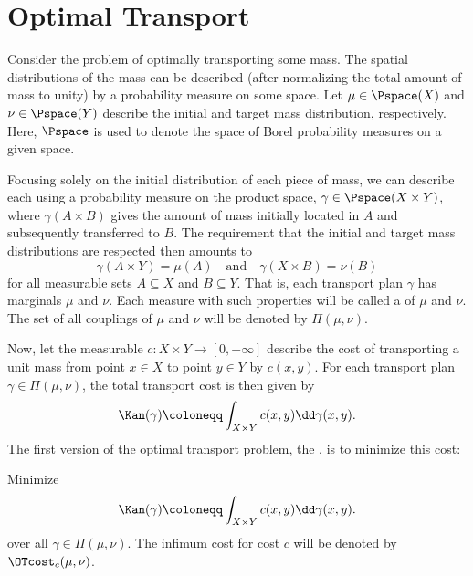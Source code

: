 \documentclass[oneside,reqno,letterpaper]{amsart}
\title[]{}
\author{Aden Chen}
\begin{document}
\maketitle

\tableofcontents

\section{Optimal Transport}

Consider the problem of optimally transporting some mass.
The spatial distributions of the mass can be described (after normalizing the total amount of mass to unity) by a probability measure on some space.
Let \(\mu \in \Pspace(X)\) and \(\nu \in \Pspace(Y)\) describe the initial and target mass distribution, respectively.
Here, \(\Pspace\) is used to denote the space of Borel probability measures on a given space.


Focusing solely on the initial distribution of each piece of mass, we can describe each  using a probability measure on the product space, \(\gamma \in \Pspace(X \times Y)\), where \(\gamma(A \times B)\) gives the amount of mass initially located in \(A\) and subsequently transferred to \(B\).
The requirement that the initial and target mass distributions are respected then amounts to
\[
  \gamma(A \times Y) = \mu(A) \quad \text{and} \quad \gamma(X \times B) = \nu(B)
\]
for all measurable sets \(A \subseteq X\) and \(B \subseteq Y\).
That is, each transport plan \(\gamma\) has marginals \(\mu\) and \(\nu\).
Each measure with such properties will be called a  of \(\mu\) and \(\nu\).
The set of all couplings of \(\mu\) and \(\nu\) will be denoted by \(\Pi(\mu, \nu)\).


Now, let the measurable  \(c: X \times Y \to [0, +\infty]\) describe the cost of transporting a unit mass from point \(x \in X\) to point \(y \in Y\) by \(c(x, y)\).
For each transport plan \(\gamma \in \Pi(\mu, \nu)\), the total transport cost is then given by
\[
  \Kan(\gamma) \coloneqq \int_{X \times Y} c(x, y) \dd \gamma(x, y).
\]
The first version of the optimal transport problem, the , is to minimize this cost:
\begin{problem*}
  Minimize
  \[
    \Kan(\gamma)
    \coloneqq \int_{X \times Y} c(x, y) \dd \gamma(x, y).
  \]
  over all \(\gamma \in \Pi(\mu, \nu)\).
  The infimum cost for cost \(c\) will be denoted by \(\OTcost_c(\mu, \nu)\).
\end{problem*}
\end{document}
